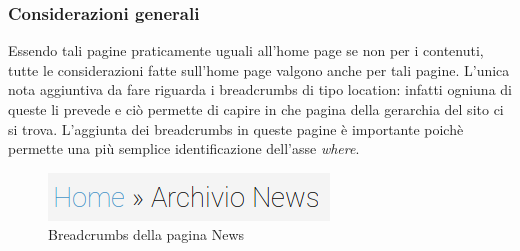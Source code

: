 \documentclass[../ProgettoTecWeb2.tex]{subfiles}
\begin{document}
		\subsubsection{Considerazioni generali}
		Essendo tali pagine praticamente uguali all'home page se non per i contenuti, tutte le considerazioni fatte sull'home page valgono anche per tali pagine. L'unica nota aggiuntiva da fare riguarda i breadcrumbs di tipo location: infatti ogniuna di queste li prevede e ciò permette di capire in che pagina della gerarchia del sito ci si trova. L'aggiunta dei breadcrumbs in queste pagine è importante poichè permette una più semplice identificazione dell'asse \textit{where}.
		\begin{figure} [H]
				\centering
				\includegraphics[scale=0.6]{img/BreadcrumbsNews}
				\caption{Breadcrumbs della pagina News}
		\end{figure}

	\newpage
\end{document}
